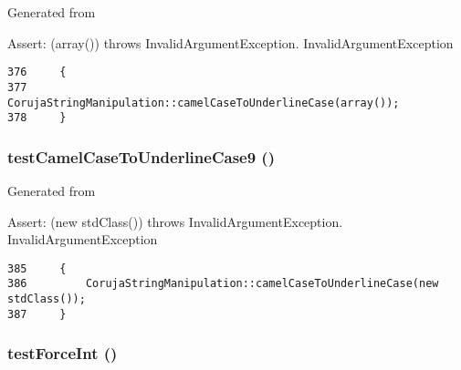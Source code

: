 Generated from \begin{Desc}
\item[Assert:](array()) throws InvalidArgumentException.  InvalidArgumentException \end{Desc}


\begin{Code}\begin{verbatim}376     {
377         CorujaStringManipulation::camelCaseToUnderlineCase(array());
378     }
\end{verbatim}
\end{Code}


\hypertarget{class_coruja_string_manipulation_test_fd8d991d47ccc9df25b510d8ffaac893}{
\subsubsection[{testCamelCaseToUnderlineCase9}]{\setlength{\rightskip}{0pt plus 5cm}testCamelCaseToUnderlineCase9 ()}}
\label{class_coruja_string_manipulation_test_fd8d991d47ccc9df25b510d8ffaac893}


Generated from \begin{Desc}
\item[Assert:](new stdClass()) throws InvalidArgumentException.  InvalidArgumentException \end{Desc}


\begin{Code}\begin{verbatim}385     {
386         CorujaStringManipulation::camelCaseToUnderlineCase(new stdClass());
387     }
\end{verbatim}
\end{Code}


\hypertarget{class_coruja_string_manipulation_test_e0bbe1a9e75c255feb3610baa5ac4f53}{
\subsubsection[{testForceInt}]{\setlength{\rightskip}{0pt plus 5cm}testForceInt ()}}
\label{class_coruja_string_manipulation_test_e0bbe1a9e75c255feb3610baa5ac4f53}


